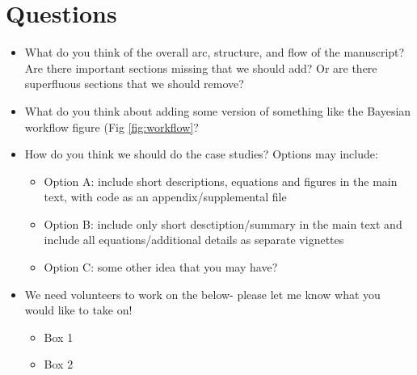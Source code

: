 \documentclass{article}
\begin{document}
\section* {Questions}
\begin{itemize}
\item What do you think of the overall arc, structure, and flow of the manuscript? Are there important sections missing that we should add? Or are there superfluous sections that we should remove?
\item What do you think about adding some version of something like the Bayesian workflow figure (Fig \ref{fig:workflow}? 
\item How do you think we should do the case studies? Options may include:
\begin {itemize}
\item Option A: include short descriptions, equations and figures in the main text, with code as an appendix/supplemental file
\item Option B: include only short desctiption/summary in the main text and include all equations/additional details as separate vignettes
\item Option C: some other idea that you may have?
\end{itemize}
\item We need volunteers to work on the below- please let me know what you would like to take on!
\begin {itemize}
\item Box 1
\item Box 2
\end{itemize}

\end{itemize}


\end{document}
